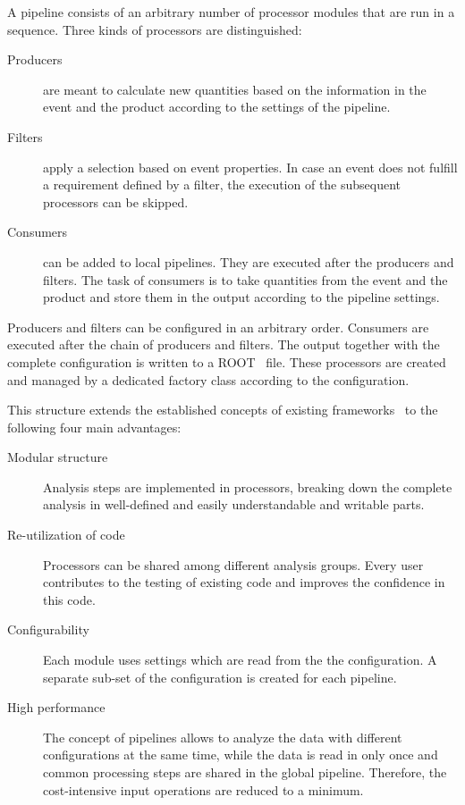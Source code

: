 \documentclass[3p]{elsarticle}
\begin{document}
A pipeline consists of an arbitrary number of processor modules that are run in a sequence.
Three kinds of processors are distinguished:
\begin{description}
\item[Producers] are meant to calculate new quantities based on the information in the event and the product according to the settings of the pipeline.
\item[Filters] apply a selection based on event properties.
In case an event does not fulfill a requirement defined by a filter, the execution of the subsequent processors can be skipped.
\item[Consumers] can be added to local pipelines.
They are executed after the producers and filters.
The task of consumers is to take quantities from the event and the product and store them in the output according to the pipeline settings.
\end{description}
Producers and filters can be configured in an arbitrary order.
Consumers are executed after the chain of producers and filters.
The output together with the complete configuration is written to a ROOT~\cite{root} file.
These processors are created and managed by a dedicated factory class according to the configuration.

This structure extends the established concepts of existing frameworks~\cite{cmssw} to the following four main advantages:
\begin{description}
\item[Modular structure] Analysis steps are implemented in processors, breaking down the complete analysis in well-defined and easily understandable and writable parts.
\item[Re-utilization of code] Processors can be shared among different analysis groups.
Every user contributes to the testing of existing code and improves the confidence in this code.
\item[Configurability] Each module uses settings which are read from the the configuration.
A separate sub-set of the configuration is created for each pipeline.
\item[High performance] The concept of pipelines allows to analyze the data with different configurations at the same time, while the data is read in only once and common processing steps are shared in the global pipeline.
Therefore, the cost-intensive input operations are reduced to a minimum.
\end{description}
\end{document}
